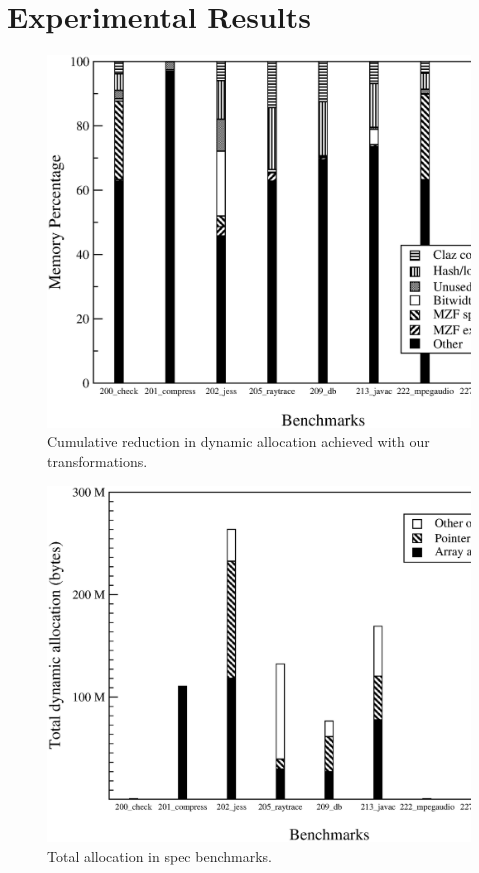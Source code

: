 \documentclass{acmconf}
\begin{document}
\section{Experimental Results}
\begin{figure}
\includegraphics[scale=0.32,clip=true]{Figures/spaceopt.eps}
\caption{Cumulative reduction in dynamic allocation achieved with
  our transformations.}
\label{fig:total}
\end{figure}
\begin{figure}
\includegraphics[scale=0.32,clip=true]{Figures/spec-space.eps}
\caption{Total allocation in spec benchmarks.}
\label{fig:space}
\end{figure}
\end{document}
